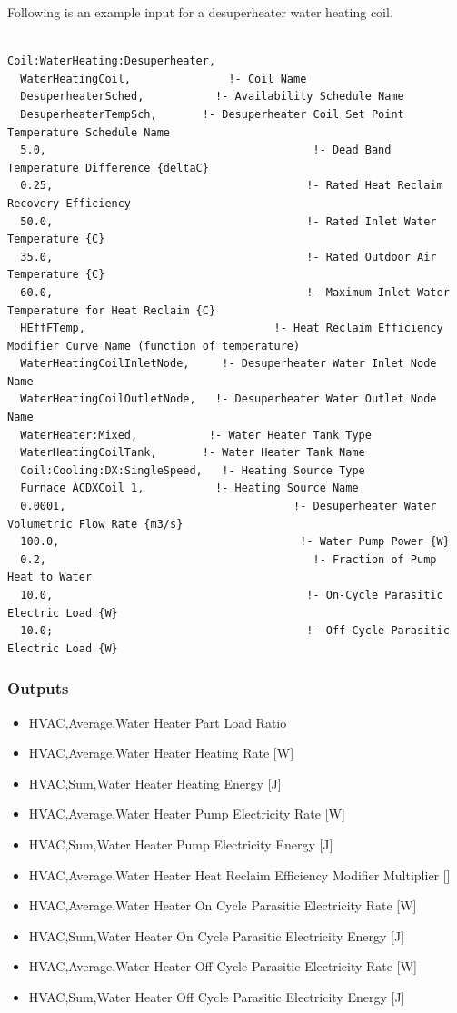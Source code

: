 Following is an example input for a desuperheater water heating coil.

\begin{lstlisting}

Coil:WaterHeating:Desuperheater,
  WaterHeatingCoil,               !- Coil Name
  DesuperheaterSched,           !- Availability Schedule Name
  DesuperheaterTempSch,       !- Desuperheater Coil Set Point Temperature Schedule Name
  5.0,                                         !- Dead Band Temperature Difference {deltaC}
  0.25,                                       !- Rated Heat Reclaim Recovery Efficiency
  50.0,                                       !- Rated Inlet Water Temperature {C}
  35.0,                                       !- Rated Outdoor Air Temperature {C}
  60.0,                                       !- Maximum Inlet Water Temperature for Heat Reclaim {C}
  HEffFTemp,                             !- Heat Reclaim Efficiency Modifier Curve Name (function of temperature)
  WaterHeatingCoilInletNode,     !- Desuperheater Water Inlet Node Name
  WaterHeatingCoilOutletNode,   !- Desuperheater Water Outlet Node Name
  WaterHeater:Mixed,           !- Water Heater Tank Type
  WaterHeatingCoilTank,       !- Water Heater Tank Name
  Coil:Cooling:DX:SingleSpeed,   !- Heating Source Type
  Furnace ACDXCoil 1,           !- Heating Source Name
  0.0001,                                   !- Desuperheater Water Volumetric Flow Rate {m3/s}
  100.0,                                     !- Water Pump Power {W}
  0.2,                                         !- Fraction of Pump Heat to Water
  10.0,                                       !- On-Cycle Parasitic Electric Load {W}
  10.0;                                       !- Off-Cycle Parasitic Electric Load {W}
\end{lstlisting}

\subsubsection{Outputs}\label{outputs-18}

\begin{itemize}
\item
  HVAC,Average,Water Heater Part Load Ratio
\item
  HVAC,Average,Water Heater Heating Rate {[}W{]}
\item
  HVAC,Sum,Water Heater Heating Energy {[}J{]}
\item
  HVAC,Average,Water Heater Pump Electricity Rate {[}W{]}
\item
  HVAC,Sum,Water Heater Pump Electricity Energy {[}J{]}
\item
  HVAC,Average,Water Heater Heat Reclaim Efficiency Modifier Multiplier {[]}
\item
  HVAC,Average,Water Heater On Cycle Parasitic Electricity Rate {[}W{]}
\item
  HVAC,Sum,Water Heater On Cycle Parasitic Electricity Energy {[}J{]}
\item
  HVAC,Average,Water Heater Off Cycle Parasitic Electricity Rate {[}W{]}
\item
  HVAC,Sum,Water Heater Off Cycle Parasitic Electricity Energy {[}J{]}
\end{itemize}

